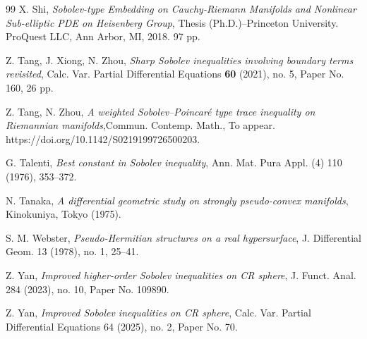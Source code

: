 \documentclass[11pt]{article}
\numberwithin{equation}{section}
\numberwithin{equation}{section}
\begin{document}
\begin{thebibliography}{99}
		X. Shi, 
		\emph{Sobolev-type Embedding on Cauchy-Riemann Manifolds and Nonlinear Sub-elliptic PDE on Heisenberg Group}, 
		Thesis (Ph.D.)--Princeton University.
		ProQuest LLC, Ann Arbor, MI, 2018. 97 pp.
		
		Z. Tang, J. Xiong, N. Zhou, 
		\emph{Sharp Sobolev inequalities involving boundary terms revisited},
		Calc. Var. Partial Differential Equations \textbf{60} (2021), no. 5, 
		Paper No. 160, 26 pp.
		
		Z. Tang, N. Zhou,
		\emph{A weighted Sobolev--Poincar\'e type trace inequality on Riemannian manifolds},Commun. Contemp. Math., To appear.
		https://doi.org/10.1142/S0219199726500203.
		
		G. Talenti, 
		\emph{Best constant in Sobolev inequality},  
		Ann. Mat. Pura Appl. (4) 110 (1976), 353--372.
		
		N. Tanaka, 
		\emph{A differential geometric study on strongly pseudo-convex manifolds}, Kinokuniya, Tokyo (1975).
		
		S. M. Webster, 
		\emph{Pseudo-Hermitian structures on a real hypersurface},
		J. Differential Geom. 13 (1978), no. 1, 25--41.
		
		Z. Yan,
		\emph{Improved higher-order Sobolev inequalities on CR sphere},
		J. Funct. Anal. 284 (2023), no. 10, Paper No. 109890.
		
		Z. Yan,
		\emph{Improved Sobolev inequalities on CR sphere},
		Calc. Var. Partial Differential Equations 64 (2025), no. 2, Paper No. 70.
		
	\end{thebibliography}
	
	
	
	
\end{document}
